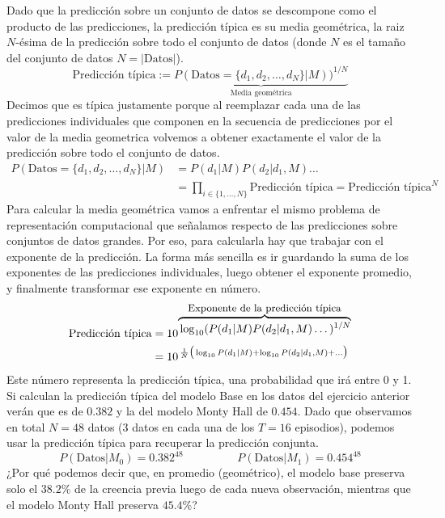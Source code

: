\documentclass[a4paper,10pt]{article}
\begin{document}
Dado que la predicción sobre un conjunto de datos se descompone como el producto de las predicciones, la predicción típica es su media geométrica, la raiz $N$-ésima de la predicción sobre todo el conjunto de datos (donde $N$ es el tamaño del conjunto de datos $N=|\text{Datos}|$).
%
\begin{equation}
\text{Predicción típica} := \underbrace{P(\text{Datos}=\{d_1, d_2, \dots, d_N \}|M))^{1/N}}_{\text{Media geométrica}}
 \end{equation}
%
Decimos que es típica justamente porque al reemplazar cada una de las predicciones individuales que componen en la secuencia de predicciones por el valor de la media geometrica volvemos a obtener exactamente el valor de la predicción sobre todo el conjunto de datos.
%
\begin{equation}
\begin{split}
 P(\text{Datos}=\{d_1, d_2, \dots, d_N \}|M) & = P(d_1|M) P(d_2|d_1,M) \dots \\
 &=  \prod_{i\in \{1,\dots,N\}} \text{Predicción típica} = \text{Predicción típica}^N
\end{split}
\end{equation}
%
Para calcular la media geométrica vamos a enfrentar el mismo problema de representación computacional que señalamos respecto de las predicciones sobre conjuntos de datos grandes.
%
Por eso, para calcularla hay que trabajar con el exponente de la predicción.
%
La forma más sencilla es ir guardando la suma de los exponentes de las predicciones individuales, luego obtener el exponente promedio, y finalmente transformar ese exponente en número.
%
\begin{equation}
\begin{split}
\text{Predicción típica} &= 10^{\overbrace{\, \log_{10} (P(d_1|M) P(d_2|d_1,M) \dots )^{1/N}}^{\text{\small Exponente de la predicción típica}} }  \\
& = 10^{\,\frac{1}{N}\big(\log_{10} P(d_1|M) + \log_{10} P(d_2|d_1,M) + \dots \big)}
\end{split}
\end{equation}
%
Este número representa la predicción típica, una probabilidad que irá entre 0 y 1.
%
Si calculan la predicción típica del modelo Base en los datos del ejercicio anterior verán que es de $0.382$ y la del modelo Monty Hall de $0.454$.
%
Dado que observamos en total $N=48$ datos ($3$ datos en cada una de los $T=16$ episodios), podemos usar la predicción típica para recuperar la predicción conjunta.
%
$$P(\text{Datos}|M_0) = 0.382^{48}   \hspace{2cm}  P(\text{Datos}|M_1) = 0.454^{48}$$
%
¿Por qué podemos decir que, en promedio (geométrico), el modelo base preserva solo el $38.2\%$ de la creencia previa luego de cada nueva observación, mientras que el modelo Monty Hall preserva $45.4\%$?
\end{document}
